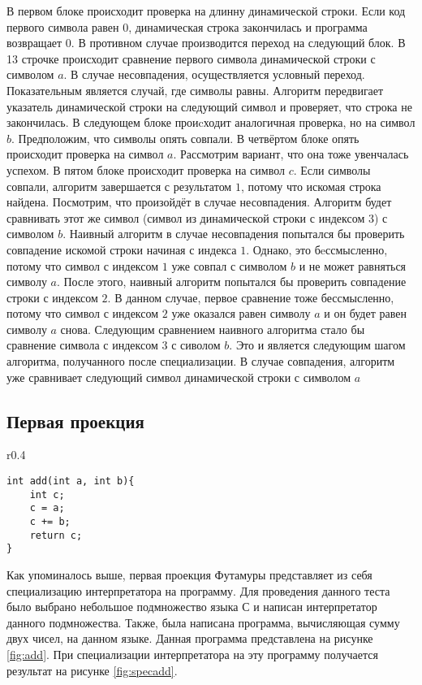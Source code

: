 \documentclass{spbau-diploma}
\begin{document}
В первом блоке происходит проверка на длинну динамической строки. Если код первого символа равен $0$, динамическая строка закончилась и программа возвращает $0$. В противном случае производится переход на следующий блок. В 13 строчке происходит сравнение первого символа динамической строки с символом $a$. В случае несовпадения, осуществляется условный переход. Показательным является случай, где символы равны. Алгоритм передвигает указатель динамической строки на следующий символ и проверяет, что строка не закончилась. В следующем блоке проиcходит аналогичная проверка, но на символ $b$. Предположим, что символы опять совпали. В четвёртом блоке опять происходит проверка на символ $a$. Рассмотрим вариант, что она тоже увенчалась успехом. В пятом блоке происходит проверка на символ $c$. Если символы совпали, алгоритм завершается с результатом $1$, потому что искомая строка найдена. Посмотрим, что произойдёт в случае несовпадения. Алгоритм будет сравнивать этот же символ (символ из динамической строки с индексом 3) с символом $b$. Наивный алгоритм в случае несовпадения попытался бы проверить совпадение искомой строки начиная с индекса $1$. Однако, это бeссмысленно, потому что символ с индексом $1$ уже совпал с символом $b$ и не может равняться символу $a$. После этого, наивный алгоритм попытался бы проверить совпадение строки с индексом $2$. В данном случае, первое сравнение тоже бессмысленно, потому что символ с индексом $2$ уже оказался равен символу $a$ и он будет равен символу $a$ снова. Следующим сравнением наивного алгоритма стало бы сравнение символа с индексом $3$ с сиволом $b$. Это и является следующим шагом алгоритма, получанного после специализации. В случае совпадения, алгоритм уже сравнивает следующий символ динамической строки с символом $a$ 

\subsection{ Первая проекция}

\begin{wrapfigure}{r}{0.4\textwidth}
\begin{lstlisting}[xleftmargin = 20pt]
int add(int a, int b){
    int c;
    c = a;
    c += b;
    return c;
}
\end{lstlisting}
\caption{ Сумма двух чисел}
\label{fig:add}
\end{wrapfigure}

Как упоминалось выше, первая проекция Футамуры представляет из себя специализацию интерпретатора на программу. Для проведения данного теста было выбрано небольшое подмножество языка С и написан интерпретатор данного подмножества. Также, была написана программа, вычисляющая сумму двух чисел, на данном языке. Данная программа представлена на рисунке \ref{fig:add}. При специализации интерпретатора на эту программу получается результат на рисунке \ref{fig:specadd}.
\end{document}

